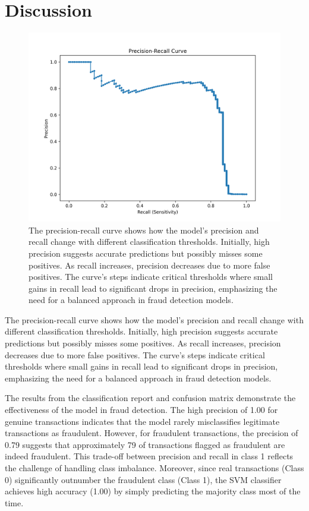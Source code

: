 \documentclass[11pt,article,oneside]{article}
\begin{document}
\section{Discussion}

\begin{figure}[!htb]
    \centering
    \includegraphics[width=0.7\linewidth]{precision_recall_curve.png}
    \caption{The precision-recall curve shows how the model's precision and recall change with different 
    classification thresholds. Initially, high precision suggests accurate predictions but possibly misses some 
    positives. As recall increases, precision decreases due to more false positives. The curve's steps indicate 
    critical thresholds where small gains in recall lead to significant drops in precision, emphasizing the need for
    a balanced approach in fraud detection models.}
    \label{Fig 2:Precision Recall Curve}
\end{figure}


The precision-recall curve shows how the model's precision and recall change with different classification thresholds. 
Initially, high precision suggests accurate predictions but possibly misses some positives. As recall increases, 
precision decreases due to more false positives. The curve's steps indicate critical thresholds where small gains in recall 
lead to significant drops in precision, emphasizing the need for a balanced approach in fraud detection models.
    
    
The results from the classification report and confusion matrix demonstrate the effectiveness of the model in fraud detection. 
The high precision of 1.00 for genuine transactions indicates that the model rarely misclassifies legitimate transactions as 
fraudulent. However, for fraudulent transactions, the precision of 0.79 suggests that approximately 79 of transactions 
flagged as fraudulent are indeed fraudulent. This trade-off between precision and recall in class 1 reflects the challenge 
of handling class imbalance. Moreover, since real transactions (Class 0) significantly outnumber the fraudulent class (Class 1),
the SVM classifier achieves high accuracy (1.00) by simply predicting the majority class most of the time. 
    
\end{document}
